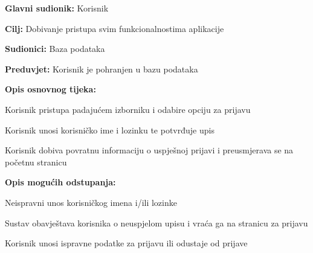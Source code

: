 					\noindent {}
					\begin{packed_item}
					
						\item \textbf{Glavni sudionik: } Korisnik 
						\item  \textbf{Cilj:} Dobivanje pristupa svim funkcionalnostima aplikacije
						\item  \textbf{Sudionici:} Baza podataka 
						\item  \textbf{Preduvjet:} Korisnik je pohranjen u bazu podataka
						\item  \textbf{Opis osnovnog tijeka:}
					
						\item[] \begin{packed_enum}
						
							\item Korisnik pristupa padajućem izborniku i odabire opciju za prijavu 
							\item Korisnik unosi korisničko ime i lozinku te potvrđuje upis
							\item Korisnik dobiva povratnu informaciju o uspješnoj prijavi i preusmjerava se na početnu stranicu
						
						\end{packed_enum}
					
						\item  \textbf{Opis mogućih odstupanja:}
					
						\item[] \begin{packed_item}
						
							\item[2.a] Neispravni unos korisničkog imena i/ili lozinke  
							\item[] \begin{packed_enum}
							
								\item Sustav obavještava korisnika o neuspjelom upisu i vraća ga na stranicu za prijavu  
								\item Korisnik unosi ispravne podatke za prijavu ili odustaje od prijave
							
							\end{packed_enum}
						\end{packed_item}
					\end{packed_item}
				
